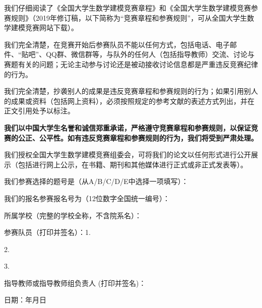 \documentclass{article}
\renewcommand*{\songti}{\CJKfamily{zhsong}}
\begin{document}
	\begin{spacing}{1.5}

		{

			我们仔细阅读了《全国大学生数学建模竞赛章程》和《全国大学生数学建模竞赛参赛规则》（2019年修订稿，以下简称为“竞赛章程和参赛规则”，可从全国大学生数学建模竞赛网站下载）。

			我们完全清楚，在竞赛开始后参赛队员不能以任何方式，包括电话、电子邮件、“贴吧”、QQ群、微信群等，与队外的任何人（包括指导教师）交流、讨论与赛题有关的问题；无论主动参与讨论还是被动接收讨论信息都是严重违反竞赛纪律的行为。

			我们完全清楚，抄袭别人的成果是违反竞赛章程和参赛规则的行为；如果引用别人的成果或资料（包括网上资料），必须按照规定的参考文献的表述方式列出，并在正文引用处予以标注。

			\textbf{我们以中国大学生名誉和诚信郑重承诺，严格遵守竞赛章程和参赛规则，以保证竞赛的公正、公平性。如有违反竞赛章程和参赛规则的行为，我们将受到严肃处理。}

			我们授权全国大学生数学建模竞赛组委会，可将我们的论文以任何形式进行公开展示（包括进行网上公示，在书籍、期刊和其他媒体进行正式或非正式发表等）。

			我们参赛选择的题号是（从A/B/C/D/E中选择一项填写）：\underline{\makebox[12\ccwd][c]{\NumberProblem}}

			我们的报名参赛报名号为（12位数字全国统一编号）：\underline{\makebox[12\ccwd][c]{\NumberCUMCMMathModeling}}

			所属学校（完整的学校全称，不含院系名）：\underline{\makebox[20\ccwd][c]{\MembersUniversity}}

			参赛队员（打印并签名）：1.\underline{\makebox[12\ccwd][c]{\MemberOne}}

			\makebox[11.5\ccwd][c]{}2.\underline{\makebox[12\ccwd][c]{\MemberTwo}}

			\makebox[11.5\ccwd][c]{}3.\underline{\makebox[12\ccwd][c]{\MemberThree}}

			指导教师或指导教师组负责人  (打印并签名)：\underline{\makebox[12\ccwd][c]{\MemberTeacher}}


			\begin{flushright}
				\songti
				日期：\underline{\makebox[4\ccwd][c]{\Year}}年\underline{\makebox[2\ccwd][c]{\Month}}月\underline{\makebox[2\ccwd][c]{\Day}}日
			\end{flushright}

			\textbf{}
		}

	\end{spacing}
\end{document}
